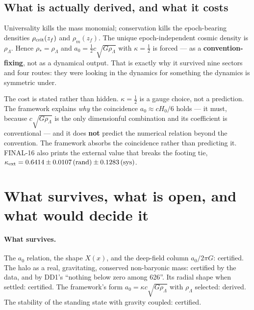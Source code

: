 \documentclass[10pt]{article}
\begin{document}
\subsection{What is actually derived, and what it costs}
Universality kills the mass monomial; conservation kills the epoch-bearing densities $\rho_{\rm crit}(z_f)$ and
$\rho_m(z_f)$. The unique epoch-independent cosmic density is $\rho_\Lambda$. Hence $\rho_*=\rho_\Lambda$ and
$a_0=\tfrac12 c\sqrt{G\rho_\Lambda}$ with $\kappa=\tfrac12$ is forced --- as a {\bf convention-fixing}, not as a
dynamical output. That is exactly why it survived nine sectors and four routes: they were looking in the
dynamics for something the dynamics is symmetric under.

The cost is stated rather than hidden. $\kappa=\tfrac12$ is a gauge choice, not a prediction. The framework
explains {\it why} the coincidence $a_0\approx cH_0/6$ holds --- it must, because $c\sqrt{G\rho_\Lambda}$ is the
only dimensionful combination and its coefficient is conventional --- and it does {\bf not} predict the numerical
relation beyond the convention. The framework absorbs the coincidence rather than predicting it. FINAL-16 also
prints the external value that breaks the footing tie, $\kappa_{\rm ext}=0.6414\pm0.0107\,({\rm rand})\pm0.1283\,({\rm sys})$.

\section{What survives, what is open, and what would decide it}

\paragraph{What survives.} The $a_0$ relation, the shape $X(x)$, and the deep-field column $a_0/2\pi G$:
certified. The halo as a real, gravitating, conserved non-baryonic mass: certified by the data, and by DD1's
``nothing below zero among 626''. Its radial shape when settled: certified. The framework's form
$a_0=\kappa c\sqrt{G\rho_\Lambda}$ with $\rho_\Lambda$ selected: derived. The stability of the standing state
with gravity coupled: certified.
\end{document}
